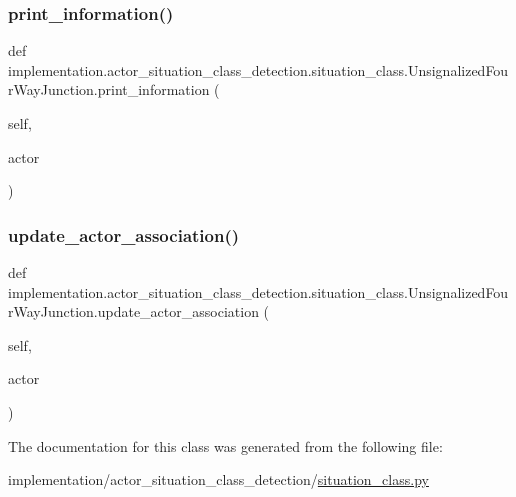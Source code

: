 \subsubsection{\texorpdfstring{print\+\_\+information()}{print\_information()}}
{\footnotesize\ttfamily def implementation.\+actor\+\_\+situation\+\_\+class\+\_\+detection.\+situation\+\_\+class.\+Unsignalized\+Four\+Way\+Junction.\+print\+\_\+information (\begin{DoxyParamCaption}\item[{}]{self,  }\item[{}]{actor }\end{DoxyParamCaption})}

\mbox{\label{classimplementation_1_1actor__situation__class__detection_1_1situation__class_1_1_unsignalized_four_way_junction_a9ac1411f1951cd2b3c989cff2c3e73e4}} 
\subsubsection{\texorpdfstring{update\+\_\+actor\+\_\+association()}{update\_actor\_association()}}
{\footnotesize\ttfamily def implementation.\+actor\+\_\+situation\+\_\+class\+\_\+detection.\+situation\+\_\+class.\+Unsignalized\+Four\+Way\+Junction.\+update\+\_\+actor\+\_\+association (\begin{DoxyParamCaption}\item[{}]{self,  }\item[{}]{actor }\end{DoxyParamCaption})}



The documentation for this class was generated from the following file\+:\begin{DoxyCompactItemize}
\item 
implementation/actor\+\_\+situation\+\_\+class\+\_\+detection/\hyperlink{situation__class_8py}{situation\+\_\+class.\+py}\end{DoxyCompactItemize}
